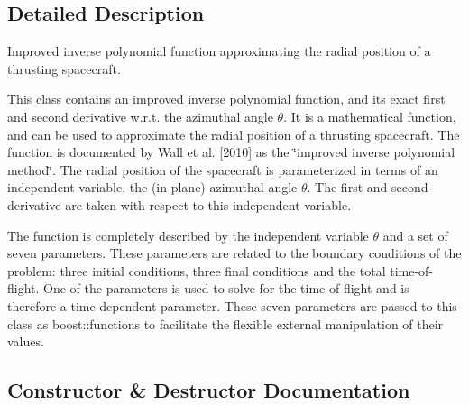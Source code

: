 \subsection{Detailed Description}
Improved inverse polynomial function approximating the radial position of a thrusting spacecraft.

This class contains an improved inverse polynomial function, and its exact first and second derivative w.\+r.\+t. the azimuthal angle $ \theta $. It is a mathematical function, and can be used to approximate the radial position of a thrusting spacecraft. The function is documented by Wall et al. \mbox{[}2010\mbox{]} as the \char`\"{}improved inverse polynomial method\char`\"{}. The radial position of the spacecraft is parameterized in terms of an independent variable, the (in-\/plane) azimuthal angle $ \theta $. The first and second derivative are taken with respect to this independent variable.

The function is completely described by the independent variable $ \theta $ and a set of seven parameters. These parameters are related to the boundary conditions of the problem\+: three initial conditions, three final conditions and the total time-\/of-\/flight. One of the parameters is used to solve for the time-\/of-\/flight and is therefore a time-\/dependent parameter. These seven parameters are passed to this class as boost\+::functions to facilitate the flexible external manipulation of their values. 

\subsection{Constructor \& Destructor Documentation}
